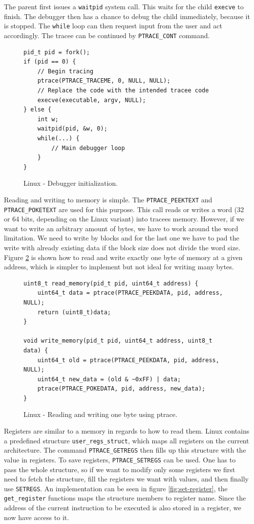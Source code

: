 The parent first issues a \texttt{waitpid} system call. This waits for the
child \texttt{execve} to finish. The debugger then has a chance to debug the
child immediately, because it is stopped. The \texttt{while} loop can then
request input from the user and act accordingly. The tracee can be continued by
\texttt{PTRACE\_CONT} command.

\begin{figure}
    \begin{verbatim}
pid_t pid = fork();
if (pid == 0) {
    // Begin tracing
    ptrace(PTRACE_TRACEME, 0, NULL, NULL);
    // Replace the code with the intended tracee code
    execve(executable, argv, NULL);
} else {
    int w;
    waitpid(pid, &w, 0);
    while(...) {
        // Main debugger loop
    }
}
    \end{verbatim}
    \caption{Linux - Debugger initialization.}
    \label{fig:debugger-init}
\end{figure}

Reading and writing to memory is simple. The \texttt{PTRACE\_PEEKTEXT} and
\texttt{PTRACE\_POKETEXT} are used for this purpose. This call reads or writes
a word (32 or 64 bits, depending on the Linux variant) into tracees memory.
However, if we want to write an arbitrary amount of bytes, we have to work
around the word limitation. We need to write by blocks and for the last one we
have to pad the write with already existing data if the block size does not
divide the word size. Figure \ref{fig:write-read} is shown how to read and
write exactly one byte of memory at a given address, which is simpler to
implement but not ideal for writing many bytes.

\begin{figure}
    \begin{verbatim}
uint8_t read_memory(pid_t pid, uint64_t address) {
    uint64_t data = ptrace(PTRACE_PEEKDATA, pid, address, NULL);
    return (uint8_t)data;
}

void write_memory(pid_t pid, uint64_t address, uint8_t data) {
    uint64_t old = ptrace(PTRACE_PEEKDATA, pid, address, NULL);
    uint64_t new_data = (old & ~0xFF) | data;
    ptrace(PTRACE_POKEDATA, pid, address, new_data);
}
    \end{verbatim}
    \caption{Linux - Reading and writing one byte using ptrace.}
    \label{fig:write-read}
\end{figure}

Registers are similar to a memory in regards to how to read them. Linux
contains a predefined structure \texttt{user\_regs\_struct}, which maps all
registers on the current architecture. The command \texttt{PTRACE\_GETREGS}
then fills up this structure with the value in registers. To save registers,
\texttt{PTRACE\_SETREGS} can be used. One has to pass the whole structure, so
if we want to modify only some registers we first need to fetch the structure,
fill the registers we want with values, and then finally use \texttt{SETREGS}.
An implementation can be seen in figure \ref{fig:set-register}, the
\texttt{get\_register} functions maps the structure members to register name.
Since the address of the current instruction to be executed is also stored in a
register, we now have access to it.


